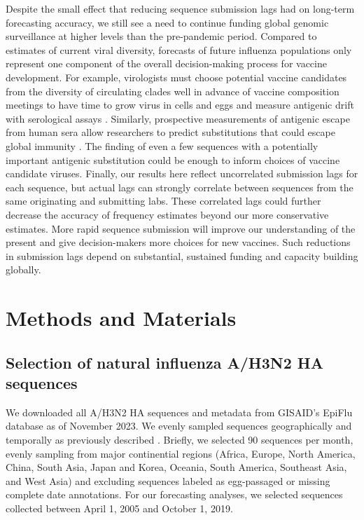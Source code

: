 \documentclass[9pt,lineno]{elife}
\begin{document}
Despite the small effect that reducing sequence submission lags had on long-term forecasting accuracy, we still see a need to continue funding global genomic surveillance at higher levels than the pre-pandemic period.
Compared to estimates of current viral diversity, forecasts of future influenza populations only represent one component of the overall decision-making process for vaccine development.
For example, virologists must choose potential vaccine candidates from the diversity of circulating clades well in advance of vaccine composition meetings to have time to grow virus in cells and eggs and measure antigenic drift with serological assays \citep{Morris2018,Loes2024}.
Similarly, prospective measurements of antigenic escape from human sera allow researchers to predict substitutions that could escape global immunity \citep{Lee2019,Greaney2022,Welsh2023}.
The finding of even a few sequences with a potentially important antigenic substitution could be enough to inform choices of vaccine candidate viruses.
Finally, our results here reflect uncorrelated submission lags for each sequence, but actual lags can strongly correlate between sequences from the same originating and submitting labs.
These correlated lags could further decrease the accuracy of frequency estimates beyond our more conservative estimates.
More rapid sequence submission will improve our understanding of the present and give decision-makers more choices for new vaccines.
Such reductions in submission lags depend on substantial, sustained funding and capacity building globally.


\section{Methods and Materials}

\subsection{Selection of natural influenza A/H3N2 HA sequences}

We downloaded all A/H3N2 HA sequences and metadata from GISAID's EpiFlu database \citep{gisaid} as of November 2023.
We evenly sampled sequences geographically and temporally as previously described \citep{Huddleston2020}.
Briefly, we selected 90 sequences per month, evenly sampling from major continential regions (Africa, Europe, North America, China, South Asia, Japan and Korea, Oceania, South America, Southeast Asia, and West Asia) and excluding sequences labeled as egg-passaged or missing complete date annotations.
For our forecasting analyses, we selected sequences collected between April 1, 2005 and October 1, 2019.
\end{document}

